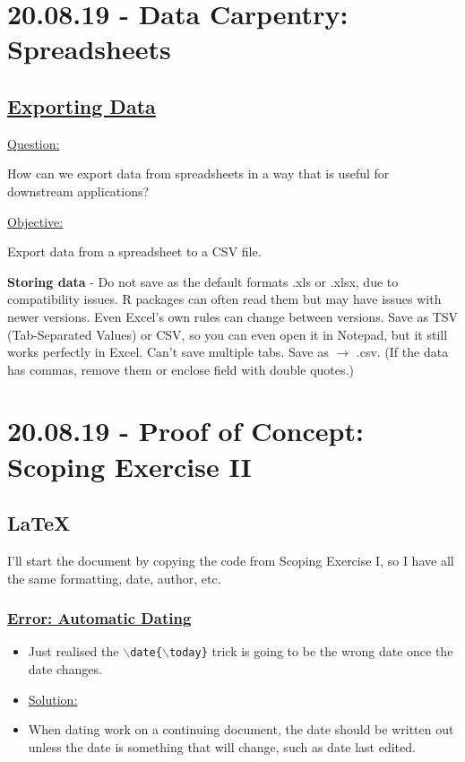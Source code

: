 \documentclass[12pt]{article}
\begin{document}
\color{black}
\vspace{1em}
\section{20.08.19 - Data Carpentry: Spreadsheets}

\subsection{\href{https://datacarpentry.org/spreadsheets-socialsci/05-exporting-data/index.html}{\textbf{Exporting Data}}}

\color{gray}
\underline{Question:}

How can we export data from spreadsheets in a way that is useful for downstream applications?

\underline{Objective:}

Export data from a spreadsheet to a CSV file.

\color{black}

\textbf{Storing data} - Do not save as the default formats .xls or .xlsx, due to compatibility issues. R packages can often read them but may have issues with newer versions. Even Excel's own rules can change between versions. Save as TSV (Tab-Separated Values) or CSV, so you can even open it in Notepad, but it still works perfectly in Excel. Can't save multiple tabs. Save as $\rightarrow$ .csv. (If the data has commas, remove them or enclose field with double quotes.)

\section{20.08.19 - Proof of Concept: Scoping Exercise II}

\subsection{LaTeX}
\vspace{1em}
I'll start the document by copying the code from Scoping Exercise I, so I have all the same formatting, date, author, etc.

\subsubsection{\texorpdfstring{\underline{Error: Automatic Dating}}{}}\label{error:er10}
\begin{itemize}
    \item Just realised the \texttt{$\backslash$date\{$\backslash$today\}} trick is going to be the wrong date once the date changes.
\end{itemize}
\begin{itemize}
\renewcommand{\labelitemi}{}
\item \underline{Solution:}
\renewcommand{\labelitemi}{$\bullet$}
    \item When dating work on a continuing document, the date should be written out unless the date is something that will change, such as date last edited.
\end{itemize}
\end{document}
